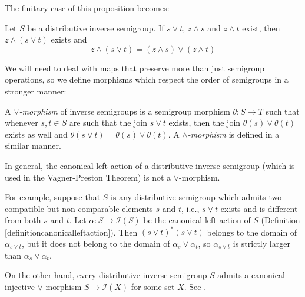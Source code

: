 The finitary case of this proposition becomes:

\begin{corollary}\label{corollarydistributivedistributemeets}
Let $S$ be a distributive inverse semigroup. If $s\lor t$, $z\land s$ and $z\land t$ exist, then $z\land(s\lor t)$ exists and
\[z\land(s\lor t)=(z\land s)\lor(z\land t)\]
\end{corollary}


We will need to deal with maps that preserve more than just semigroup operations, so we define morphisms which respect the order of semigroups in a stronger manner:

\nocite{MR3715848}%

\begin{definition}
A \emph{$\lor$-morphism} of inverse semigroups is a semigroup morphism $\theta:S\to T$ such that whenever $s,t\in S$ are such that the join $s\lor t$ exists, then the join $\theta(s)\lor\theta(t)$ exists as well and $\theta(s\lor t)=\theta(s)\lor\theta(t)$. A \emph{$\land$-morphism} is defined in a similar manner.
\end{definition}

\begin{remark}
In general, the canonical left action of a distributive inverse semigroup (which is used in the Vagner-Preston Theorem) is not a $\lor$-morphism.

For example, suppose that $S$ is any distributive semigroup which admits two compatible but non-comparable elements $s$ and $t$, i.e., $s\lor t$ exists and is different from both $s$ and $t$. Let $\alpha:S\to\mathcal{I}(S)$ be the canonical left action of $S$ (Definition \ref{definitioncanonicalleftaction}). Then $(s\lor t)^*(s\lor t)$ belongs to the domain of $\alpha_{s\lor t}$, but it does not belong to the domain of $\alpha_s\lor\alpha_t$, so $\alpha_{s\lor t}$ is strictly larger than $\alpha_s\lor\alpha_t$.

On the other hand, every distributive inverse semigroup $S$ admits a canonical injective $\lor$-morphism $S\to\mathcal{I}(X)$ for some set $X$. See \cite[Section 3.3]{MR3700423}.
\end{remark} %

